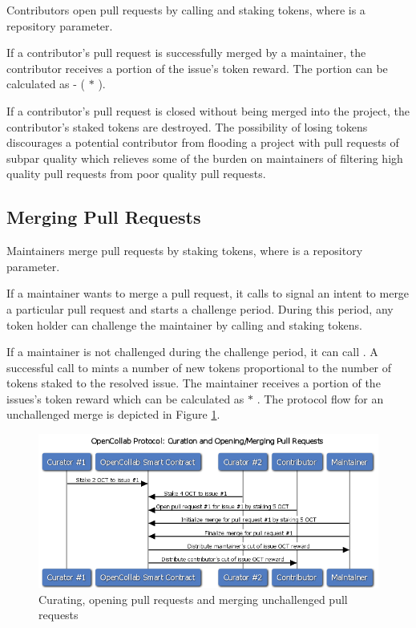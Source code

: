 Contributors open pull requests by calling  and staking  tokens,
where  is a repository parameter.

If a contributor's pull request is successfully merged by a maintainer, the
contributor receives a portion of the issue's token reward. The portion can be
calculated as  - ( $*$ ).

If a contributor's pull request is closed without being merged into the project,
the contributor's  staked tokens are destroyed. The
possibility of losing tokens discourages a potential contributor from flooding a
project with pull requests of subpar quality which relieves some of the burden
on maintainers of filtering high quality pull requests from poor quality pull requests.

\subsection{Merging Pull Requests}
\label{sec:merge}

Maintainers merge pull requests by staking  tokens,
where  is a repository parameter.

If a maintainer wants to merge a pull request, it calls
 to signal an intent to merge a particular pull
request and starts a challenge period. During this period, any token holder can
challenge the maintainer by calling  and staking
 tokens.

If a maintainer is not challenged during the challenge period, it can call
. A successful call to
 mints a number of new tokens
proportional to the number of tokens staked to the resolved issue. The maintainer receives a portion of the
issues's token reward which can be calculated as  $*$
. The protocol flow for an unchallenged merge is
depicted in Figure \ref{fig:unchallenged}.

\begin{figure}[]
  \centering
  \includegraphics[width=\linewidth,keepaspectratio]{figures/OpenCollab-Protocol-Curation-And-Opening-Merging-Pull-Requests.png}
  \caption{Curating, opening pull requests and merging unchallenged pull requests}
  \label{fig:unchallenged}
\end{figure}


